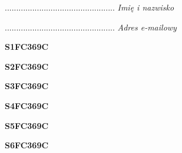 \begin{turn}{90}\begin{minipage}{\linewidth} \vspace{20mm} ................................................  \textit{Imię i nazwisko}\end{minipage}\end{turn}

\begin{turn}{90}\begin{minipage}{\linewidth} \vspace{20mm} ................................................  \textit{Adres e-mailowy}\end{minipage}\end{turn}

\begin{turn}{90}\huge \begin{minipage}{\linewidth} \vspace{10mm}\textbf{S1FC369C}\end{minipage}\end{turn}

\begin{turn}{90}\huge \begin{minipage}{\linewidth} \vspace{10mm}\textbf{S2FC369C}\end{minipage}\end{turn}

\begin{turn}{90}\huge \begin{minipage}{\linewidth} \vspace{10mm}\textbf{S3FC369C}\end{minipage}\end{turn}

\begin{turn}{90}\huge \begin{minipage}{\linewidth} \vspace{10mm}\textbf{S4FC369C}\end{minipage}\end{turn}

\begin{turn}{90}\huge \begin{minipage}{\linewidth} \vspace{10mm}\textbf{S5FC369C}\end{minipage}\end{turn}

\begin{turn}{90}\huge \begin{minipage}{\linewidth} \vspace{10mm}\textbf{S6FC369C}\end{minipage}\end{turn}

